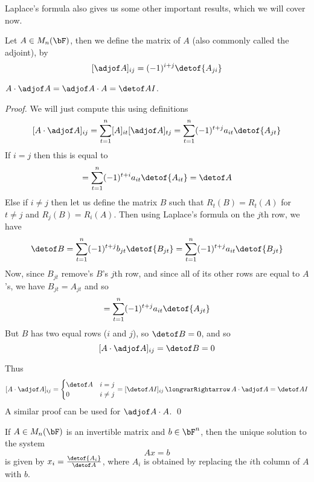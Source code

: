 Laplace's formula also gives us some other important results, which we will cover now.

\begin{defn*}

    Let $A\in M_n(\bF)$, then we define the  matrix of $A$ (also commonly called the adjoint), by
    \[ [\adjof A]_{ij} = (-1)^{i+j}\detof{A_{ji}} \]

\end{defn*}

\begin{prop*}

    $A\cdot\adjof A=\adjof A\cdot A=\detof AI$.

\end{prop*}

\begin{proof}

    We will just compute this using definitions
    \[ [A\cdot\adjof A]_{ij} = \sum_{t=1}^n [A]_{it}[\adjof A]_{tj} = \sum_{t=1}^n (-1)^{t+j}a_{it}\detof{A_{jt}} \]
    If $i=j$ then this is equal to
    \[ = \sum_{t=1}^n (-1)^{t+i}a_{it}\detof{A_{it}} = \detof A \]
    Else if $i\neq j$ then let us define the matrix $B$ such that $R_t(B)=R_t(A)$ for $t\neq j$ and $R_j(B)=R_i(A)$.
    Then using Laplace's formula on the $j$th row, we have
    \[ \detof B = \sum_{t=1}^n (-1)^{t+j} b_{jt}\detof{B_{jt}} = \sum_{t=1}^n (-1)^{t+j} a_{it}\detof{B_{jt}} \]
    Now, since $B_{jt}$ remove's $B$'s $j$th row, and since all of its other rows are equal to $A$'s, we have $B_{jt}=A_{jt}$ and so
    \[ = \sum_{t=1}^n (-1)^{t+j} a_{it}\detof{A_{jt}} \]
    But $B$ has two equal rows ($i$ and $j$), so $\detof B=0$, and so
    \[ [A\cdot\adjof A]_{ij} = \detof B = 0 \]

    Thus
    \[ [A\cdot\adjof A]_{ij} = \begin{cases} \detof A & i=j \\ 0 & i\neq j \end{cases} = [\detof AI]_{ij} \implies A\cdot\adjof A = \detof AI \]
    A similar proof can be used for $\adjof A\cdot A$.
    \qed

\end{proof}

\begin{thrm*}

    If $A\in M_n(\bF)$ is an invertible matrix and $b\in\bF^n$, then the unique solution to the system
    \[ Ax = b \]
    is given by $x_i=\frac{\detof{A_i}}{\detof A}$, where $A_i$ is obtained by replacing the $i$th column of $A$ with $b$.

\end{thrm*}

